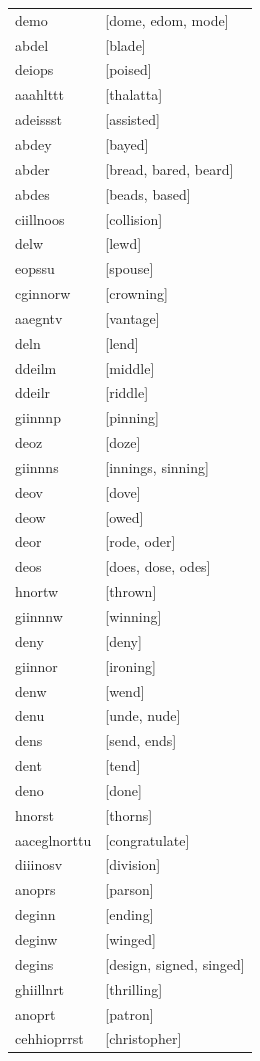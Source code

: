 \documentclass{article}
\begin{document}
\begin{tabular}{ll}
demo & [dome, edom, mode] \\
abdel & [blade] \\
deiops & [poised] \\
aaahlttt & [thalatta] \\
adeissst & [assisted] \\
abdey & [bayed] \\
abder & [bread, bared, beard] \\
abdes & [beads, based] \\
ciillnoos & [collision] \\
delw & [lewd] \\
eopssu & [spouse] \\
cginnorw & [crowning] \\
aaegntv & [vantage] \\
deln & [lend] \\
ddeilm & [middle] \\
ddeilr & [riddle] \\
giinnnp & [pinning] \\
deoz & [doze] \\
giinnns & [innings, sinning] \\
deov & [dove] \\
deow & [owed] \\
deor & [rode, oder] \\
deos & [does, dose, odes] \\
hnortw & [thrown] \\
giinnnw & [winning] \\
deny & [deny] \\
giinnor & [ironing] \\
denw & [wend] \\
denu & [unde, nude] \\
dens & [send, ends] \\
dent & [tend] \\
deno & [done] \\
hnorst & [thorns] \\
aaceglnorttu & [congratulate] \\
diiinosv & [division] \\
anoprs & [parson] \\
deginn & [ending] \\
deginw & [winged] \\
degins & [design, signed, singed] \\
ghiillnrt & [thrilling] \\
anoprt & [patron] \\
cehhioprrst & [christopher] \\

\end{tabular}
\end{document}
